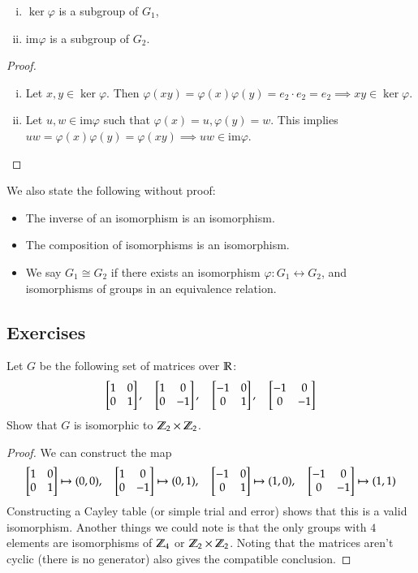\begin{proposition}
\!
\begin{enumerate}[(i)]
	\item $\ker \varphi$ is a subgroup of $G_1$, 
	\item $\mathrm{im} \varphi$ is a subgroup of $G_2$. 
\end{enumerate}	
\end{proposition}

\begin{proof}
\!
\begin{enumerate}[(i)]
	\item Let $x, y\in \ker \varphi$. Then $\varphi(xy)=\varphi(x)\varphi(y)=e_2\cdot e_2=e_2\implies xy\in \ker \varphi$. 
	\item Let $u, w\in \mathrm{im} \varphi$ such that $\varphi(x) = u, \varphi(y) = w$. This implies $uw = \varphi(x)\varphi(y) = \varphi(xy)\implies uw\in \mathrm{im}\varphi$. 
\end{enumerate}	
\end{proof}

We also state the following without proof: 
\begin{itemize}
\item The inverse of an isomorphism is an isomorphism. 
\item The composition of isomorphisms is an isomorphism. 
\item We say $G_1\cong G_2$ if there exists an isomorphism $\varphi: G_1\leftrightarrow G_2$, and isomorphisms of groups in an equivalence relation. 	
\end{itemize}

\subsection{Exercises}

 Let $G$ be the following set of matrices over $\mathbb{R}$: 
\[\mtrx{1 & 0 \\ 0 & 1}, \quad \mtrx{1 & 0 \\ 0 & -1}, \quad \mtrx{-1 & 0 \\ 0 & 1}, \quad \mtrx{-1 & 0 \\ 0 & -1}\]
Show that $G$ is isomorphic to $\mathbb{Z}_2\times \mathbb{Z}_2$. 
\begin{proof}
We can construct the map 
\[\mtrx{1 & 0 \\ 0 & 1} \mapsto (0,0), \quad \mtrx{1 & 0 \\ 0 & -1}  \mapsto (0, 1), \quad \mtrx{-1 & 0 \\ 0 & 1}  \mapsto (1, 0), \quad \mtrx{-1 & 0 \\ 0 & -1}  \mapsto (1,1)\]
Constructing a Cayley table (or simple trial and error) shows that this is a valid isomorphism. Another things we could note is that the only groups with $4$ elements are isomorphisms of $\mathbb{Z}_4$ or $\mathbb{Z}_2\times\mathbb{Z}_2$. Noting that the matrices aren't cyclic (there is no generator) also gives the compatible conclusion. 
\end{proof}

